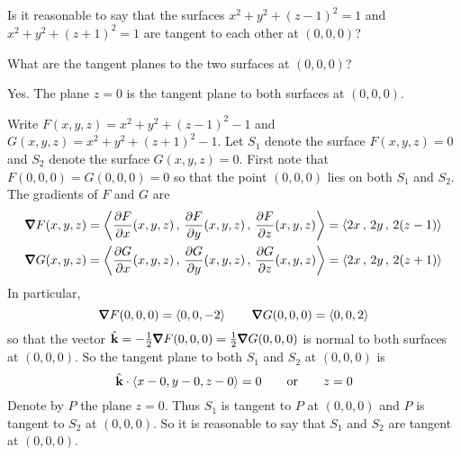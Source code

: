 \newcommand{\vt}{\mathbf{t}}



\subsection*{\Conceptual}


\begin{question}
Is it reasonable to say that the surfaces $x^2+y^2+(z-1)^2=1$ and
$x^2+y^2+(z+1)^2=1$ are tangent to each other at $(0,0,0)$?
\end{question}

\begin{hint}
What are the tangent planes to the two surfaces at $(0,0,0)$?
\end{hint}

\begin{answer}
Yes. The plane $z=0$ is the tangent plane to both surfaces at $(0,0,0)$.
\end{answer}

\begin{solution}
Write $F(x,y,z) = x^2+y^2+(z-1)^2-1$ and $G(x,y,z) = x^2+y^2+(z+1)^2-1$.
Let $S_1$ denote the surface $F(x,y,z)=0$ and $S_2$ denote the surface 
$G(x,y,z)=0$.
First note that $F(0,0,0)=G(0,0,0)=0$ so that the point $(0,0,0)$ lies
on both $S_1$ and $S_2$. The gradients of $F$ and $G$ are 
\begin{align*}
\vnabla F(x,y,z)
  &=\llt\pdiff{F}{x}(x,y,z)\,,\,
        \pdiff{F}{y}(x,y,z)\,,\,
        \pdiff{F}{z}(x,y,z)\rgt 
    =\llt 2x\,,\,2y\,,\,2(z-1)\rgt \\
\vnabla G(x,y,z)
  &=\llt\pdiff{G}{x}(x,y,z)\,,\,
        \pdiff{G}{y}(x,y,z)\,,\,
        \pdiff{G}{z}(x,y,z)\rgt 
    =\llt 2x\,,\,2y\,,\,2(z+1)\rgt 
\end{align*}
In particular,
\begin{equation*}
\vnabla F(0,0,0)=\llt 0,0,-2\rgt\qquad
\vnabla G(0,0,0)=\llt 0,0,2\rgt
\end{equation*}
so that the vector $\hk=-\frac{1}{2}\vnabla F(0,0,0)
                       =\frac{1}{2}\vnabla G(0,0,0)$
is normal to both surfaces at $(0,0,0)$. So the tangent plane to 
both $S_1$ and $S_2$ at $(0,0,0)$ is
\begin{equation*}
\hat{\mathbf{k}}\cdot\left< x-0,y-0,z-0\right>=0\qquad\text{or}\qquad z=0
\end{equation*}
Denote by $P$ the plane $z=0$. 
Thus $S_1$ is tangent to $P$ at $(0,0,0)$ and $P$ is tangent to $S_2$ 
at $(0,0,0)$. So it is reasonable to say that $S_1$ and $S_2$ are tangent at
$(0,0,0)$.
\end{solution}


